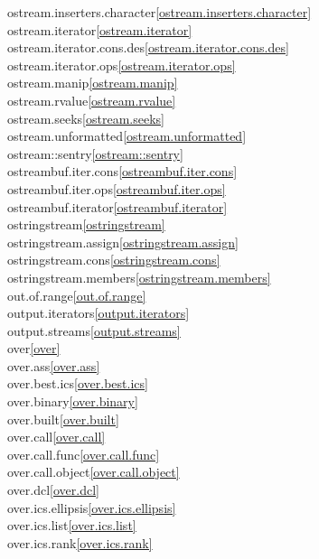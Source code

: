 \begin{multicols}{2}
ostream.inserters.character\quad\ref{ostream.inserters.character}\\
ostream.iterator\quad\ref{ostream.iterator}\\
ostream.iterator.cons.des\quad\ref{ostream.iterator.cons.des}\\
ostream.iterator.ops\quad\ref{ostream.iterator.ops}\\
ostream.manip\quad\ref{ostream.manip}\\
ostream.rvalue\quad\ref{ostream.rvalue}\\
ostream.seeks\quad\ref{ostream.seeks}\\
ostream.unformatted\quad\ref{ostream.unformatted}\\
ostream::sentry\quad\ref{ostream::sentry}\\
ostreambuf.iter.cons\quad\ref{ostreambuf.iter.cons}\\
ostreambuf.iter.ops\quad\ref{ostreambuf.iter.ops}\\
ostreambuf.iterator\quad\ref{ostreambuf.iterator}\\
ostringstream\quad\ref{ostringstream}\\
ostringstream.assign\quad\ref{ostringstream.assign}\\
ostringstream.cons\quad\ref{ostringstream.cons}\\
ostringstream.members\quad\ref{ostringstream.members}\\
out.of.range\quad\ref{out.of.range}\\
output.iterators\quad\ref{output.iterators}\\
output.streams\quad\ref{output.streams}\\
over\quad\ref{over}\\
over.ass\quad\ref{over.ass}\\
over.best.ics\quad\ref{over.best.ics}\\
over.binary\quad\ref{over.binary}\\
over.built\quad\ref{over.built}\\
over.call\quad\ref{over.call}\\
over.call.func\quad\ref{over.call.func}\\
over.call.object\quad\ref{over.call.object}\\
over.dcl\quad\ref{over.dcl}\\
over.ics.ellipsis\quad\ref{over.ics.ellipsis}\\
over.ics.list\quad\ref{over.ics.list}\\
over.ics.rank\quad\ref{over.ics.rank}\\

\end{multicols}
